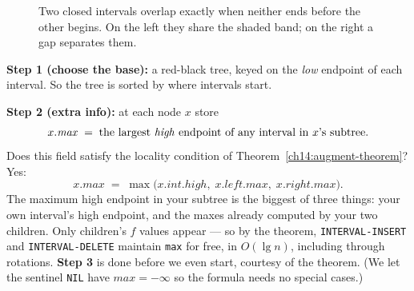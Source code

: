 \begin{figure}[H]
\centering
{}
\caption{Two closed intervals overlap exactly when neither ends before the other
begins. On the left they share the shaded band; on the right a gap separates
them.}
\label{ch14:fig-overlap}
\end{figure}

\textbf{Step 1 (choose the base):} a red-black tree, keyed on the \emph{low}
endpoint of each interval. So the tree is sorted by where intervals start.

\textbf{Step 2 (extra info):} at each node $x$ store
\[
  x.\mathit{max} \;=\;
  \text{the largest \emph{high} endpoint of any interval in $x$'s subtree.}
\]
Does this field satisfy the locality condition of
Theorem~\ref{ch14:augment-theorem}? Yes:
\[
  x.\mathit{max} \;=\; \max\bigl(
     x.\mathit{int}.\mathit{high},\;
     x.\mathit{left}.\mathit{max},\;
     x.\mathit{right}.\mathit{max}
  \bigr).
\]
The maximum high endpoint in your subtree is the biggest of three things: your
own interval's high endpoint, and the maxes already computed by your two
children. Only children's $f$ values appear --- so by the theorem,
\texttt{INTERVAL-INSERT} and \texttt{INTERVAL-DELETE} maintain \texttt{max} for
free, in $O(\lg n)$, including through rotations. \textbf{Step 3} is done before
we even start, courtesy of the theorem. (We let the sentinel \texttt{NIL} have
$\mathit{max} = -\infty$ so the formula needs no special cases.)

